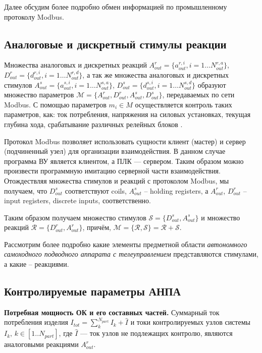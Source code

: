 Далее обсудим более подробно обмен информацией по промышленному протоколу Modbus.

\subsection{Аналоговые и дискретный стимулы реакции} \label{sect:stimulus_reactions_def}

Множества аналоговых и дискретных реакций
$A^r_{out} = \{a^{r,i}_{out}, i = 1 \dots N^{r,a}_{out}\}$,
$D^r_{out} = \{d^{r,i}_{out}, i = 1 \dots N^{r,d}_{out}\}$,
а так же множества аналоговых и дискретных стимулов
$A^s_{out} = \{a^{s,i}_{out}, i = 1 \dots N^{s,a}_{out}\}$,
$D^s_{out} = \{d^{s,i}_{out}, i = 1 \dots N^{s,d}_{out}\}$
образуют множество параметров $\mathcal{M} = \{A^r_{out}, D^r_{out}, A^s_{out}, D^s_{out}\}$,
передаваемых по сети Modbus. С помощью параметров $m_i \in M$ осуществляется контроль таких параметров,
как: ток потребления, напряжения на силовых установках,
текущая глубина хода, срабатывание различных релейных блоков \todo{\ldots}.

Протокол Modbus позволяет использовать сущности клиент (мастер) и сервер (подчиненный узел)
для организации взаимодействия. В данном случае программа ВУ является клиентом, а ПЛК --- сервером.
Таким образом можно произвести программную имитацию серверной части взаимодействия.
Отождествляя множества стимулов и реакций с протоколом Modbus, мы получаем, что
$D^s_{out}$ соответствуют coils, $A^s_{out}$ -- holding registers,
а $A^r_{out}$,  $D^r_{out}$ -- input registers, discrete inputs, соответственно.

Таким образом получаем множество стимулов $\mathcal{S} = \{D^s_{out}, A^s_{out}\}$
и множество реакций $\mathcal{R} = \{D^r_{out}, A^r_{out}\}$,
причём, $\mathcal{M} = \{\mathcal{R}, \mathcal{S}\} = \mathcal{R} + \mathcal{S}$.

Рассмотрим более подробно какие элементы предметной области
\textit{автономного самоходного подводного аппарата с телеуправлением}
представляются стимулами, а какие -- реакциями.

\subsection{Контролируемые параметры АНПА}

\textbf{Потребная мощность ОК и его составных частей.}
Суммарный ток потребления изделия $I_{tot} = \sum_k^{N_{part}} I_k + \hat I$
и токи контролируемых узлов системы $I_k,\, k\in[1..N_{part}]$,
где $\hat I$ --- ток узлов не подлежащих контролю,
являются аналоговыми реакциями $A^r_{out}$.

